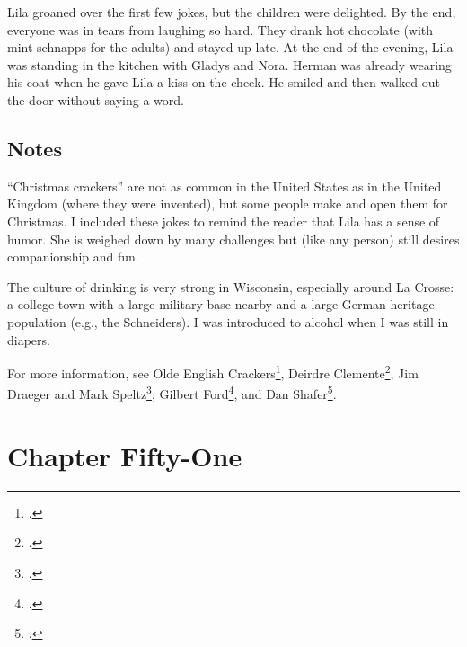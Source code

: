 \documentclass[
  letterpaper,
]{book}
\begin{document}
Lila groaned over the first few jokes, but the children were delighted.
By the end, everyone was in tears from laughing so hard. They drank hot
chocolate (with mint schnapps for the adults) and stayed up late. At the
end of the evening, Lila was standing in the kitchen with Gladys and
Nora. Herman was already wearing his coat when he gave Lila a kiss on
the cheek. He smiled and then walked out the door without saying a word.

\section{Notes}\label{notes-52}

``Christmas crackers'' are not as common in the United States as in the
United Kingdom (where they were invented), but some people make and open
them for Christmas. I included these jokes to remind the reader that
Lila has a sense of humor. She is weighed down by many challenges but
(like any person) still desires companionship and fun.

The culture of drinking is very strong in Wisconsin, especially around
La Crosse: a college town with a large military base nearby and a large
German-heritage population (e.g., the Schneiders). I was introduced to
alcohol when I was still in diapers.

For more information, see Olde English Crackers\footnote{.},
Deirdre Clemente\footnote{.}, Jim Draeger and Mark
Speltz\footnote{.}, Gilbert Ford\footnote{.}, and Dan Shafer\footnote{.}.


\chapter{Chapter Fifty-One}\label{chapter-fifty-one}
\end{document}
